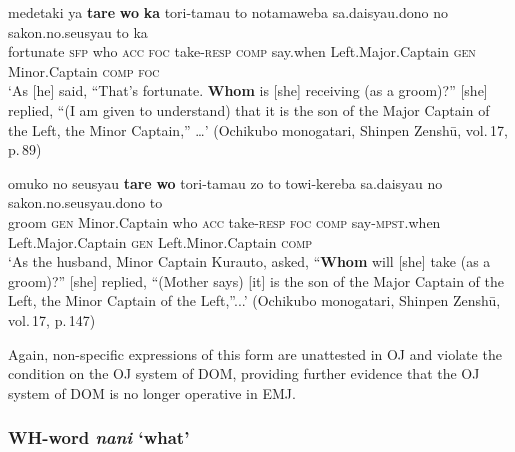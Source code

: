 \documentclass[output=paper]{LSP/langsci}
\begin{document}
\begin{exe}
\ex%
\label{07-fr-ex:43}
\gll medetaki ya \textbf{tare} \textbf{wo} \textbf{ka} tori-tamau to notamaweba sa.daisyau.dono no sakon.no.seusyau to ka\\
fortunate \textsc{sfp} who \textsc{acc} \textsc{foc} take-\textsc{resp} \textsc{comp} say.when Left.Major.Captain \textsc{gen} Minor.Captain \textsc{comp} \textsc{foc}\\
\glt ‘As [he] said, “That’s fortunate. \textbf{Whom} is [she] receiving (as a groom)?” [she] replied, “(I am given to understand) that it is the son of the Major Captain of the Left, the Minor Captain,” …’  (Ochikubo monogatari, Shinpen Zenshū, vol.\,17, p.\,89) 
\end{exe}

\begin{exe}
\ex%
\label{07-fr-ex:44}
\gll omuko no seusyau \textbf{tare} \textbf{wo} tori-tamau zo to towi-kereba sa.daisyau no sakon.no.seusyau.dono to\\
groom \textsc{gen} Minor.Captain who \textsc{acc} take-\textsc{resp} \textsc{foc} \textsc{comp} say-\textsc{mpst}.when Left.Major.Captain \textsc{gen} Left.Minor.Captain \textsc{comp}\\
\glt ‘As the husband, Minor Captain Kurauto, asked, “\textbf{Whom} will [she] take (as a groom)?” [she] replied, “(Mother says) [it] is the son of the Major Captain of the Left, the Minor Captain of the Left,”...’ (Ochikubo monogatari, Shinpen Zenshū, vol.\,17, p.\,147)
\end{exe}

Again, non-specific expressions of this form are unattested in OJ   and violate the condition on the OJ system of DOM, providing further evidence that the OJ system of DOM is no longer operative in EMJ. 

\subsubsection{WH-word \textit{nani} ‘what’}
\label{07-subsubsec:3-2-2}
\end{document}
